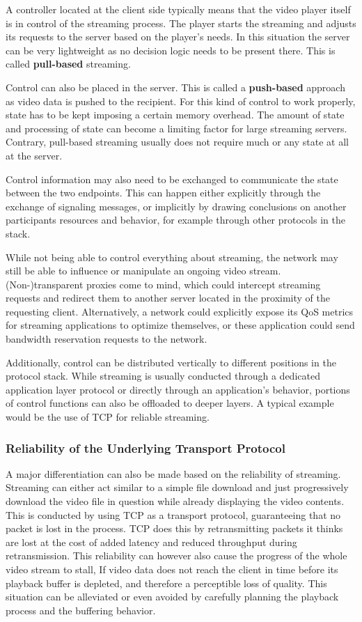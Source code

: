 A controller located at the client side typically means that the video player itself is in control of the streaming process. The player starts the streaming and adjusts its requests to the server based on the player's needs. In this situation the server can be very lightweight as no decision logic needs to be present there. This is called \textbf{pull-based} streaming.

Control can also be placed in the server. This is called a \textbf{push-based} approach as video data is pushed to the recipient. For this kind of control to work properly, state has to be kept imposing a certain memory overhead. The amount of state and processing of state can become a limiting factor for large streaming servers. Contrary, pull-based streaming usually does not require much or any state at all at the server.

Control information may also need to be exchanged to communicate the state between the two endpoints. This can happen either explicitly through the exchange of signaling messages, or implicitly by drawing conclusions on another participants resources and behavior, for example through other protocols in the stack.

While not being able to control everything about streaming, the network may still be able to influence or manipulate an ongoing video stream. (Non-)transparent proxies come to mind, which could intercept streaming requests and redirect them to another server located in the proximity of the requesting client. Alternatively, a network could explicitly expose its \gls{QoS} metrics for streaming applications to optimize themselves, or these application could send bandwidth reservation requests to the network.

Additionally, control can be distributed vertically to different positions in the protocol stack. While streaming is usually conducted through a dedicated application layer protocol or directly through an application's behavior, portions of control functions can also be offloaded to deeper layers. A typical example would be the use of \gls{TCP} for reliable streaming.


\subsubsection{Reliability of the Underlying Transport Protocol}
A major differentiation can also be made based on the reliability of streaming. Streaming can either act similar to a simple file download and just progressively download the video file in question while already displaying the video contents. This is conducted by using \gls{TCP} as a transport protocol, guaranteeing that no packet is lost in the process. \gls{TCP} does this by retransmitting packets it thinks are lost at the cost of added latency and reduced throughput during retransmission. This reliability can however also cause the progress of the whole video stream to stall, If video data does not reach the client in time before its playback buffer is depleted, and therefore a perceptible loss of quality. This situation can be alleviated or even avoided by carefully planning the playback process and the buffering behavior.

